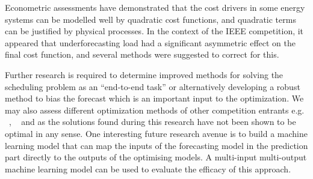 \documentclass[conference]{IEEEtran}
\begin{document}
Econometric assessments have demonstrated that the cost drivers in some energy systems can be modelled well by quadratic cost functions, and quadratic terms can be justified by physical processes.  In the context of the IEEE competition, it appeared that underforecasting load had a significant asymmetric effect on the final cost function, and several methods were suggested to correct for this.

Further research is required to determine improved methods for solving the scheduling problem as an ``end-to-end task'' or alternatively developing a robust method to bias the forecast which is an important input to the optimization. We may also assess different optimization methods of other competition entrants e.g. ~\cite{abolghasemi2021state}, ~\cite{honda} and \cite{evergi} as the solutions found during this research have not been shown to be optimal in any sense. One interesting future research avenue is to build a machine learning model that can map the inputs of the forecasting model in the prediction part directly to the outputs of the optimising models. A multi-input multi-output machine learning model can be used to evaluate the efficacy of this approach. 
\end{document}
